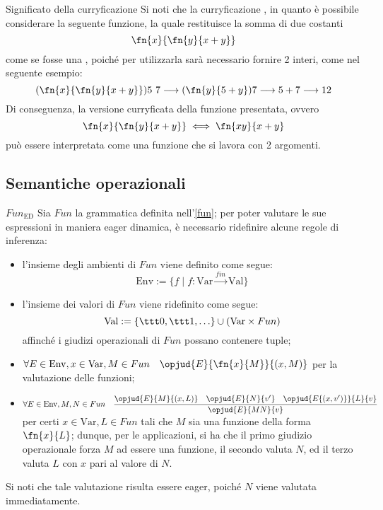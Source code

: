 \documentclass[a4paper, 12pt]{report}
\begin{document}
    \begin{framedobs}{Significato della curryficazione}
        Si noti che la curryficazione , in quanto è possibile considerare la seguente funzione, la quale restituisce la somma di due costanti $$\fn{x}{\fn{y}{x + y}}$$ come se fosse una , poiché per utilizzarla sarà necessario fornire 2 interi, come nel seguente esempio: $$(\fn{x}{\fn{y}{x + y}})5 \ 7 \longrightarrow (\fn{y}{5 + y})7 \longrightarrow 5 + 7 \longrightarrow 12$$ Di conseguenza, la versione curryficata della funzione presentata, ovvero $$\fn{x}{\fn{y}{x + y}} \iff \fn{xy}{x + y}$$ può essere interpretata come una funzione che si lavora con 2 argomenti.
    \end{framedobs}

    \subsection{Semantiche operazionali}

    \begin{framedprop}{$Fun_\mathrm{ED}$}
        Sia $Fun$ la grammatica definita nell'\cref{fun}; per poter valutare le sue espressioni in maniera eager dinamica, è necessario ridefinire alcune regole di inferenza:

        \begin{itemize}
            \item l'insieme degli ambienti di $Fun$ viene definito come segue: $$\mathrm{Env} := \{f \mid f : \mathrm{Var} \xrightarrow{fin} \mathrm{Val}\}$$
            \item l'insieme dei valori di $Fun$ viene ridefinito come segue: $$\mathrm{Val} := \{ \ttt 0, \ttt 1 , \ldots \} \cup (\mathrm{Var} \times Fun)$$ affinché i giudizi operazionali di $Fun$ possano contenere tuple;
            \item $\forall E \in \mathrm{Env}, x \in \mathrm{Var}, M \in Fun \quad \opjud{E}{\fn{x}{M}}{(x,M)}$ per la valutazione delle funzioni;
            \item $\forall E \in \mathrm{Env}, M,N \in Fun \quad \dfrac{\opjud{E}{M}{(x,L)} \quad \opjud{E}{N}{v'} \quad \opjud{E\{(x,v')\}}{L}{v}}{\opjud{E}{MN}{v}}$ per certi $x \in \mathrm{Var}, L \in Fun$ tali che $M$ sia una funzione della forma $\fn{x}{L}$; dunque, per le applicazioni, si ha che il primo giudizio operazionale forza $M$ ad essere una funzione, il secondo valuta $N$, ed il terzo valuta $L$ con $x$ pari al valore di $N$.
        \end{itemize}

        Si noti che tale valutazione risulta essere eager, poiché $N$ viene valutata immediatamente.
    \end{framedprop}
\end{document}
